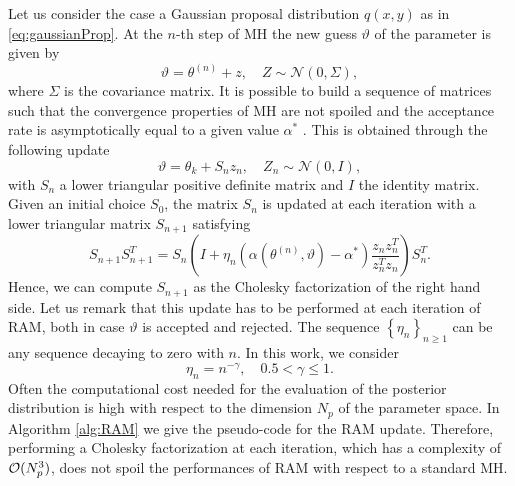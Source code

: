 Let us consider the case a Gaussian proposal distribution $q(x,y)$ as in \eqref{eq:gaussianProp}. At the $n$-th step of MH the new guess $\vartheta$ of the parameter is given by
\begin{equation}
\vartheta = \theta^{(n)} + z, \quad Z \sim \mathcal{N}(0, \Sigma),
\end{equation}
where $\Sigma$ is the covariance matrix. It is possible to build a sequence of matrices such that the convergence properties of MH are not spoiled and the acceptance rate is asymptotically equal to a given value $\alpha^*$ \cite{Vih12}. This is obtained through the following update 
\begin{equation}
\vartheta = \theta_k + S_n z_n, \quad Z_n \sim \mathcal{N}(0, I),
\end{equation}
with $S_n$ a lower triangular positive definite matrix and $I$ the identity matrix. Given an initial choice $S_0$, the matrix $S_n$ is updated at each iteration with a lower triangular matrix $S_{n+1}$ satisfying
\begin{equation}\label{eq:RAMupdate}
S_{n+1}S_{n+1}^T = S_n\left(I + \eta_n\left(\alpha(\theta^{(n)}, \vartheta) - \alpha^*\right)\frac{z_nz_n^T}{z_n^Tz_n}\right)S_n^T.
\end{equation}
Hence, we can compute $S_{n+1}$ as the Cholesky factorization of the right hand side. Let us remark that this update has to be performed at each iteration of RAM, both in case $\vartheta$ is accepted and rejected. The sequence $\left\{\eta_n\right\}_{n\geq 1}$ can be any sequence decaying to zero with $n$. In this work, we consider
\begin{equation}
\eta_n = n^{-\gamma}, \quad 0.5 < \gamma \leq 1.
\end{equation}
Often the computational cost needed for the evaluation of the posterior distribution is high with respect to the dimension $N_p$ of the parameter space. In Algorithm \ref{alg:RAM} we give the pseudo-code for the RAM update. Therefore, performing a Cholesky factorization at each iteration, which has a complexity of $\mathcal{O}(N_p^3)$, does not spoil the performances of RAM with respect to a standard MH. 

